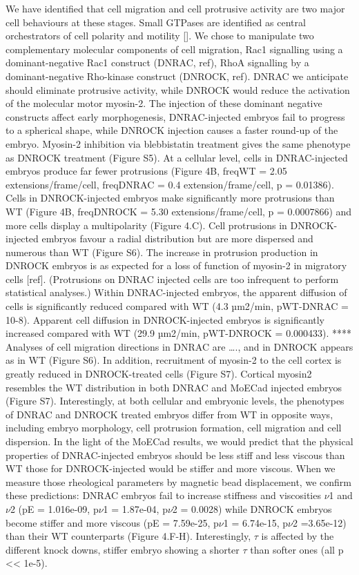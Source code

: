 We have identified that cell migration and cell protrusive activity are two major cell behaviours at these stages.
Small GTPases are identified as central orchestrators of cell polarity and motility [].
We chose to manipulate two complementary molecular components of cell migration, Rac1 signalling using a dominant-negative Rac1 construct (DNRAC, ref), RhoA signalling by a dominant-negative Rho-kinase construct (DNROCK, ref).
DNRAC we anticipate should eliminate protrusive activity, while DNROCK would reduce the activation of the molecular motor myosin-2.
The injection of these dominant negative constructs affect early morphogenesis, DNRAC-injected embryos fail to progress to a spherical shape, while DNROCK injection causes a faster round-up of the embryo.
Myosin-2 inhibition via blebbistatin treatment gives the same phenotype as DNROCK treatment (Figure S5).
At a cellular level, cells in DNRAC-injected embryos produce far fewer protrusions (Figure 4B, freqWT = 2.05 extensions/frame/cell, freqDNRAC = 0.4 extension/frame/cell, p = 0.01386).
Cells in DNROCK-injected embryos make significantly more protrusions than WT (Figure 4B, freqDNROCK = 5.30 extensions/frame/cell, p = 0.0007866) and more cells display a multipolarity (Figure 4.C).
Cell protrusions in DNROCK-injected embryos favour a radial distribution but are more dispersed and numerous than WT (Figure S6).
The increase in protrusion production in DNROCK embryos is as expected for a loss of function of myosin-2 in migratory cells [ref].
(Protrusions on DNRAC injected cells are too infrequent to perform statistical analyses.)
Within DNRAC-injected embryos, the apparent diffusion of cells is significantly reduced compared with WT (4.3 µm2/min, pWT-DNRAC = 10-8).
Apparent cell diffusion in DNROCK-injected embryos is significantly increased compared with WT (29.9 µm2/min, pWT-DNROCK = 0.000433).
**** Analyses of cell migration directions in DNRAC are …., and in DNROCK appears as in WT (Figure S6).
In addition, recruitment of myosin-2 to the cell cortex is greatly reduced in DNROCK-treated cells (Figure S7).
Cortical myosin2 resembles the WT distribution in both DNRAC and MoECad injected embryos (Figure S7).
Interestingly, at both cellular and embryonic levels, the phenotypes of DNRAC and DNROCK treated embryos differ from WT in opposite ways, including embryo morphology, cell protrusion formation, cell migration and cell dispersion.
In the light of the MoECad results, we would predict that the physical properties of DNRAC-injected embryos should be less stiff and less viscous than WT those for DNROCK-injected would be stiffer and more viscous.
When we measure those rheological parameters by magnetic bead displacement, we confirm these predictions: DNRAC embryos fail to increase stiffness and viscosities $\nu$1 and $\nu$2 (pE = 1.016e-09, p$\nu$1 = 1.87e-04, p$\nu$2 = 0.0028) while DNROCK embryos become stiffer and more viscous (pE = 7.59e-25, p$\nu$1 = 6.74e-15, p$\nu$2 =3.65e-12) than their WT counterparts (Figure 4.F-H).
Interestingly, $\tau$ is affected by the different knock downs, stiffer embryo showing a shorter $\tau$ than softer ones (all p << 1e-5).

